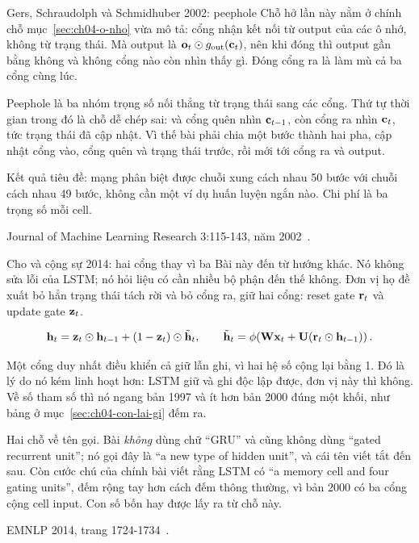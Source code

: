\begin{bridge}{Gers, Schraudolph và Schmidhuber 2002: peephole}
Chỗ hở lần này nằm ở chính chỗ mục~\ref{sec:ch04-o-nho} vừa mô tả: cổng nhận
kết nối từ output của các ô nhớ, không từ trạng thái. Mà
output là
\(\mathbf{o}_t \odot g_{\mathrm{out}}(\mathbf{c}_t)\), nên khi
 đóng thì output gần bằng không và không cổng nào còn
nhìn thấy gì. Đóng cổng ra là làm mù cả ba cổng cùng lúc.

Peephole là ba nhóm trọng số nối thẳng từ trạng thái sang các cổng. Thứ tự thời
gian trong đó là chỗ dễ chép sai:  và cổng quên nhìn
\(\mathbf{c}_{t-1}\), còn cổng ra nhìn \(\mathbf{c}_t\), tức trạng thái đã cập
nhật. Vì thế bài phải chia một bước thành hai pha, cập nhật cổng vào, cổng quên
và trạng thái trước, rồi mới tới cổng ra và output.

Kết quả tiêu đề: mạng phân biệt được chuỗi xung cách nhau 50 bước với chuỗi
cách nhau 49 bước, không cần một ví dụ huấn luyện ngắn nào. Chi phí là ba trọng
số mỗi cell.

Journal of Machine Learning Research 3:115-143, năm
2002~\autocite{gers2002timing}.
\end{bridge}

\begin{bridge}{Cho và cộng sự 2014: hai cổng thay vì ba}
Bài này đến từ hướng khác. Nó không sửa lỗi của LSTM; nó hỏi liệu có cần nhiều
bộ phận đến thế không. Đơn vị họ đề xuất bỏ hẳn trạng thái tách rời và bỏ cổng
ra, giữ hai cổng: reset gate \(\mathbf{r}_t\) và update gate \(\mathbf{z}_t\).

\[
  \mathbf{h}_t = \mathbf{z}_t \odot \mathbf{h}_{t-1}
             + (1 - \mathbf{z}_t) \odot \tilde{\mathbf{h}}_t,
  \qquad
  \tilde{\mathbf{h}}_t = \phi\!\left(
    \mathbf{W}\mathbf{x}_t + \mathbf{U}(\mathbf{r}_t \odot \mathbf{h}_{t-1})
  \right).
\]

Một cổng duy nhất điều khiển cả giữ lẫn ghi, vì hai hệ số cộng lại bằng 1. Đó
là lý do nó kém linh hoạt hơn: LSTM giữ và ghi độc lập được, đơn vị này thì
không. Về số tham số thì nó ngang bản 1997 và ít hơn bản 2000 đúng một khối,
như bảng ở mục~\ref{sec:ch04-con-lai-gi} đếm ra.

Hai chỗ về tên gọi. Bài \emph{không} dùng chữ \enquote{GRU} và cũng không dùng
\enquote{gated recurrent unit}; nó gọi đây là \enquote{a new type of hidden
unit}, và cái tên viết tắt đến sau. Còn cước chú của chính bài viết rằng LSTM
có \enquote{a memory cell and four gating units}, đếm rộng tay hơn cách đếm
thông thường, vì bản 2000 có ba cổng cộng cell input. Con số bốn hay được lấy
ra từ chỗ này.

EMNLP 2014, trang 1724-1734~\autocite{cho2014encdec}.
\end{bridge}

